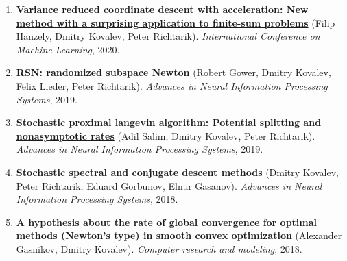 \begin{enumerate}
\item
\textbf{\href{https://proceedings.mlr.press/v119/hanzely20b.html}{Variance reduced coordinate descent with acceleration: New method with a surprising application to finite-sum problems}} (Filip Hanzely, Dmitry Kovalev, Peter Richtarik). \textit{International Conference on Machine Learning}, 2020.
\item
\textbf{\href{https://proceedings.neurips.cc/paper/2019/hash/bc6dc48b743dc5d013b1abaebd2faed2-Abstract.html}{RSN: randomized subspace Newton}} (Robert Gower, Dmitry Kovalev, Felix Lieder, Peter Richtarik). \textit{Advances in Neural Information Processing Systems}, 2019.
\item
\textbf{\href{https://proceedings.neurips.cc/paper/2019/hash/6a8018b3a00b69c008601b8becae392b-Abstract.html}{Stochastic proximal langevin algorithm: Potential splitting and nonasymptotic rates}} (Adil Salim, Dmitry Kovalev, Peter Richtarik). \textit{Advances in Neural Information Processing Systems}, 2019.
\item
\textbf{\href{https://proceedings.neurips.cc/paper_files/paper/2018/hash/e721a54a8cf18c8543d44782d9ef681f-Abstract.html}{Stochastic spectral and conjugate descent methods}} (Dmitry Kovalev, Peter Richtarik, Eduard Gorbunov, Elnur Gasanov). \textit{Advances in Neural Information Processing Systems}, 2018.
\item
\textbf{\href{http://crm-en.ics.org.ru/journal/article/2685/}{A hypothesis about the rate of global convergence for optimal methods (Newton’s type) in smooth convex optimization}} (Alexander Gasnikov, Dmitry Kovalev). \textit{Computer research and modeling}, 2018.
\end{enumerate}
